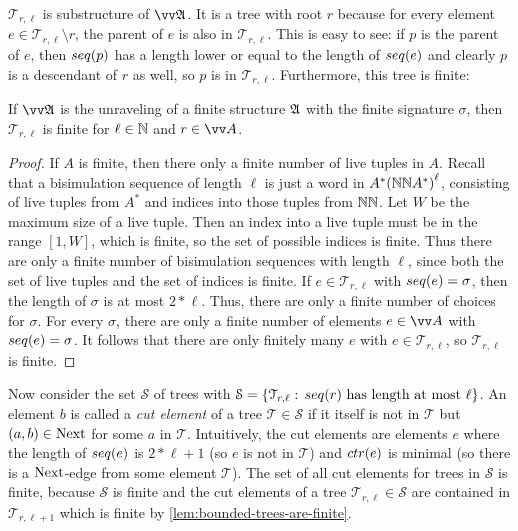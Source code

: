 $\mathcal{T}_{r,\ell}$ is substructure of $\unravel{A}$.
It is a tree with root $r$ because for every element $e \in \mathcal{T}_{r,\ell} \setminus {r}$, the parent of $e$ is also in $\mathcal{T}_{r,\ell}$.
This is easy to see: if $p$ is the parent of $e$, then $\seq{p}$ has a length lower or equal to the length of $\seq{e}$ and clearly $p$ is a descendant of $r$ as well, so $p$ is in $\mathcal{T}_{r,\ell}$.
Furthermore, this tree is finite:
\begin{lemma}\label{lem:bounded-trees-are-finite}
  If $\unravel{A}$ is the unraveling of a finite structure ${\mathfrak{A}}$ with the finite signature $\sigma$, then $\mathcal{T}_{r,\ell}$ is finite for $\ell \in {\mathbb{N}}$ and $r \in \unraveldom{A}$.
\end{lemma}
\begin{proof}
If $A$ is finite, then there only a finite number of live tuples in $A$.
Recall that a bisimulation sequence of length $\ell$ is just a word in $A^*{({\mathbb{N}}{\mathbb{N}}{}A^{*})}^{\ell}$, consisting of live tuples from $A^{*}$ and indices into those tuples from ${\mathbb{N}}{\mathbb{N}}$.
Let $W$ be the maximum size of a live tuple.
Then an index into a live tuple must be in the range $[1,W]$, which is finite, so the set of possible indices is finite.
Thus there are only a finite number of bisimulation sequences with length $\ell$, since both the set of live tuples and the set of indices is finite.
If $e \in \mathcal{T}_{r,\ell}$ with $\seq{e} = \sigma$, then the length of $\sigma$ is at most $2 * \ell$.
Thus, there are only a finite number of choices for $\sigma$.
For every $\sigma$, there are only a finite number of elements $e \in \unraveldom{A}$ with $\seq{e} = \sigma$.
It follows that there are only finitely many $e$ with $e \in \mathcal{T}_{r,\ell}$, so $\mathcal{T}_{r,\ell}$ is finite.
\end{proof}
Now consider the set $\mathcal{S}$ of trees with $\mathcal{S} = \left\{ \mathcal{T}_{r,\ell}:\, \seq{r}\ \text{has length at most $\ell$}\right\}$.
An element $b$ is called a \emph{cut element} of a tree $\mathcal{T} \in \mathcal{S}$ if it itself is not in $\mathcal{T}$ but $(a,b) \in \mathrm{Next}$ for some $a$ in $\mathcal{T}$.
Intuitively, the cut elements are elements $e$ where the length of $\seq{e}$ is $2 * \ell + 1$ (so $e$ is not in $\mathcal{T}$) and $\ctr{e}$ is minimal (so there is a $\mathrm{Next}$-edge from some element $\mathcal{T}$).
The set of all cut elements for trees in $\mathcal{S}$ is finite, because $\mathcal{S}$ is finite and the cut elements of a tree $\mathcal{T}_{r,\ell} \in \mathcal{S}$ are contained in $\mathcal{T}_{r,\ell+1}$ which is finite by \cref{lem:bounded-trees-are-finite}.
